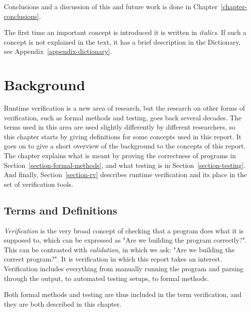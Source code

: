 \documentclass[a4paper,11pt]{kth-mag}
\begin{document}
Conclusions and a discussion of this and future work is done in
Chapter~\ref{chapter-conclusions}.

The first time an important concept is introduced it is written in
\textit{italics}. If such a concept is not explained in the text, it has a
brief description in the Dictionary, see Appendix~\ref{appendix-dictionary}.






\pagestyle{newchap}
\chapter{Background} \label{chapter-background}

Runtime verification is a new area of research, but the research on other forms
of verification, such as formal methods and testing, goes back several decades.
The terms used in this area are used slightly differently by different
researchers, so this chapter starts by giving definitions for some concepts
used in this report. It goes on to give a short overview of the background to
the concepts of this report. The chapter explains what is meant by proving the
correctness of programs in Section~\ref{section-formal-methods}, and what
testing is in Section~\ref{section-testing}. And finally,
Section~\ref{section-rv} describes runtime verification and its place in the
set of verification tools.


\section{Terms and Definitions}
\label{section-background-definitions}
\label{section-definition-verification}
\label{section-system-model}

\textit{Verification} is the very broad concept of checking that a program does
what it is supposed to, which can be expressed as "Are we building the program
correctly?". This can be contrasted with \textit{validation}, in which we ask:
"Are we building the correct program?". It is verification in which this report
takes an interest. Verification includes everything from manually running the
program and parsing through the output, to automated testing setups, to formal
methods.

Both formal methods and testing are thus included in the term verification, and
they are both described in this chapter.
\end{document}
